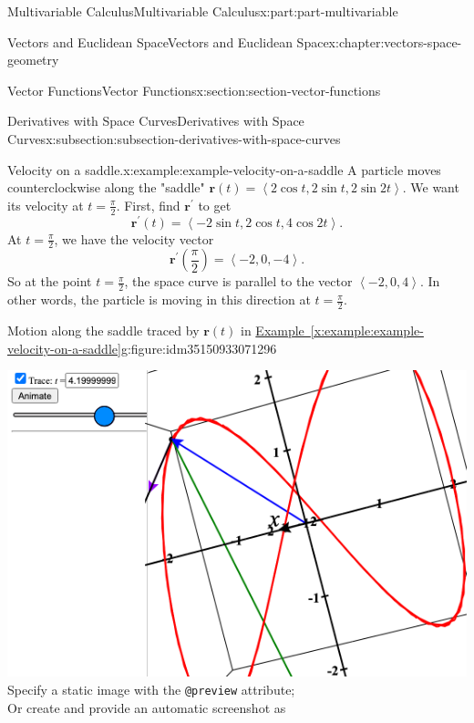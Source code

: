 \documentclass[twoside,10pt,]{tufte-book}
\newcommand{\xreffont}{\relax}
\newcommand{\mono}[1]{\texttt{#1}}
\numberwithin{equation}{part}
\newlength{\qrsize}
\newlength{\previewwidth}
\newcommand{\vb}[1]{\mathbf{#1}}
\newcommand{\dotprod}[1]{\left\langle #1 \right\rangle}
\begin{document}
\begin{partptx}{Multivariable Calculus}{}{Multivariable Calculus}{}{}{x:part:part-multivariable}
\begin{chapterptx}{Vectors and Euclidean Space}{}{Vectors and Euclidean Space}{}{}{x:chapter:vectors-space-geometry}
\begin{sectionptx}{Vector Functions}{}{Vector Functions}{}{}{x:section:section-vector-functions}
\begin{subsectionptx}{Derivatives with Space Curves}{}{Derivatives with Space Curves}{}{}{x:subsection:subsection-derivatives-with-space-curves}
\begin{example}{Velocity on a saddle.}{x:example:example-velocity-on-a-saddle}
A particle moves counterclockwise along the "saddle" \(\mathbf{r}(t) = \dotprod{2\cos t, 2\sin t, 2\sin 2t}\). We want its velocity at \(t=\frac{\pi}{2}\). First, find \(\mathbf{r}^\prime\) to get%
%
\begin{equation*}
\mathbf{r}^\prime(t) = \dotprod{-2\sin t,2\cos t,4\cos2t}.
\end{equation*}
At \(t=\frac{\pi}{2}\), we have the velocity vector%
%
\begin{equation*}
\mathbf{r}^\prime\left(\frac{\pi}{2}\right) = \dotprod{-2,0,-4}.
\end{equation*}
So at the point \(t=\frac{\pi}{2}\), the space curve is parallel to the vector \(\dotprod{-2,0,4}\). In other words, the particle is moving in this direction at \(t=\frac{\pi}{2}\).%
\end{example}
\begin{figureptx}{Motion along the saddle traced by \(\vb{r}(t)\) in \hyperref[x:example:example-velocity-on-a-saddle]{Example~{\xreffont\ref{x:example:example-velocity-on-a-saddle}}}}{g:figure:idm35150933071296}{}%
\centering
\setlength{\qrsize}{9em}
\setlength{\previewwidth}{\linewidth}
\addtolength{\previewwidth}{-\qrsize}
\begin{tcbraster}[raster columns=2, raster column skip=1pt, raster halign=center, raster force size=false, raster left skip=0pt, raster right skip=0pt]%
\begin{tcolorbox}[previewstyle, width=\previewwidth]%
%
{\includegraphics[width=0.80\linewidth,height=\qrsize,keepaspectratio]{generated/preview/calcplot3d-velocity-on-a-saddle-preview.png}}%
{\small{}Specify a static image with the \mono{@preview} attribute;\\%
Or create and provide an automatic screenshot as\\%
}
\end{tcolorbox}
\end{tcbraster}
\end{figureptx}
\end{subsectionptx}
\end{sectionptx}
\end{chapterptx}
\end{partptx}
\end{document}
